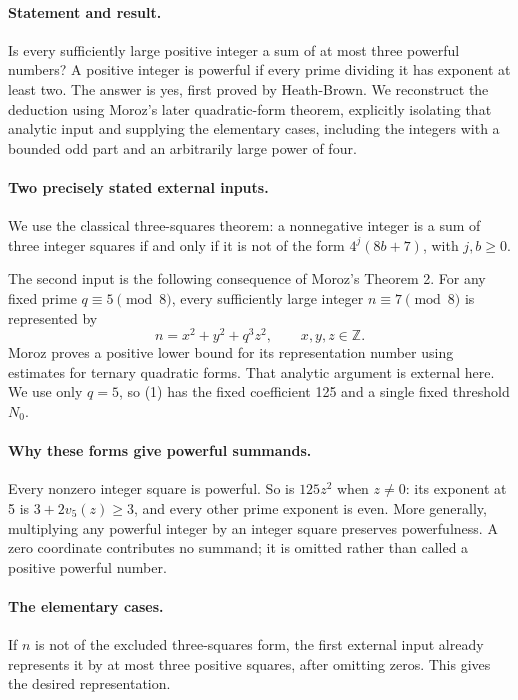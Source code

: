 \paragraph{Statement and result.}
Is every sufficiently large positive integer a sum of at most three powerful numbers? A positive integer is powerful if every prime dividing it has exponent at least two. The answer is yes, first proved by Heath-Brown. We reconstruct the deduction using Moroz's later quadratic-form theorem, explicitly isolating that analytic input and supplying the elementary cases, including the integers with a bounded odd part and an arbitrarily large power of four.

\paragraph{Two precisely stated external inputs.}
We use the classical three-squares theorem: a nonnegative integer is a sum of three integer squares if and only if it is not of the form \(4^j(8b+7)\), with \(j,b\geq0\).

The second input is the following consequence of Moroz's Theorem 2. For any fixed prime \(q\equiv5\pmod8\), every sufficiently large integer \(n\equiv7\pmod8\) is represented by
\[
 n=x^2+y^2+q^3z^2,\qquad x,y,z\in\mathbb Z. \tag{1}
\]
Moroz proves a positive lower bound for its representation number using estimates for ternary quadratic forms. That analytic argument is external here. We use only \(q=5\), so (1) has the fixed coefficient 125 and a single fixed threshold \(N_0\).

\paragraph{Why these forms give powerful summands.}
Every nonzero integer square is powerful. So is \(125z^2\) when \(z\ne0\): its exponent at 5 is \(3+2v_5(z)\geq3\), and every other prime exponent is even. More generally, multiplying any powerful integer by an integer square preserves powerfulness. A zero coordinate contributes no summand; it is omitted rather than called a positive powerful number.

\paragraph{The elementary cases.}
If \(n\) is not of the excluded three-squares form, the first external input already represents it by at most three positive squares, after omitting zeros. This gives the desired representation.


